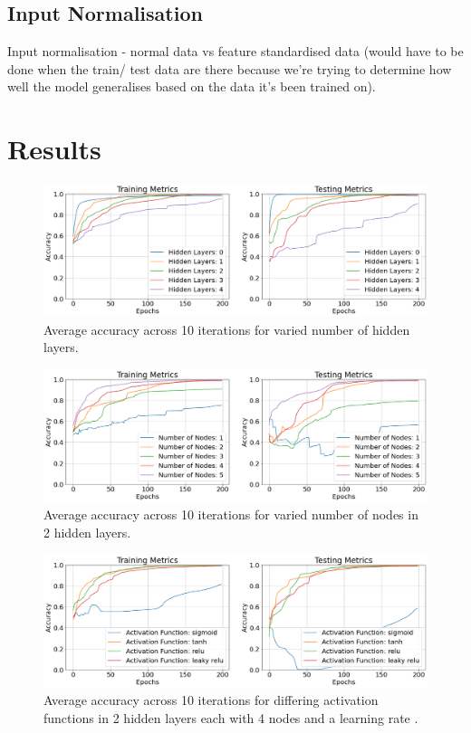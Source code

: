 \documentclass{article}
\begin{document}
\subsection{Input Normalisation}
Input normalisation - normal data vs feature standardised data (would have to be done when the train/ test data are there because we're trying to determine how well the model generalises based on the data it's been trained on).


\section{Results}


\begin{figure}[H]
  \centering
  \includegraphics[width=\textwidth]{figs/layers.png}
  \caption{
    Average accuracy across 10 iterations for varied number of hidden
    layers.
  }
  \label{fig:layers}
\end{figure}

\begin{figure}[H]
  \centering
  \includegraphics[width=\textwidth]{figs/nodes.png}
  \caption{
    Average accuracy across 10 iterations for varied number of nodes
    in 2 hidden layers.
  }
  \label{fig:nodes}
\end{figure}

\begin{figure}[H]
  \centering
  \includegraphics[width=\textwidth]{figs/funcs.png}
  \caption{
    Average accuracy across 10 iterations for differing activation
    functions in 2 hidden layers each with 4 nodes and a learning rate
     .
  }
  \label{fig:funcs}
\end{figure}
\end{document}
